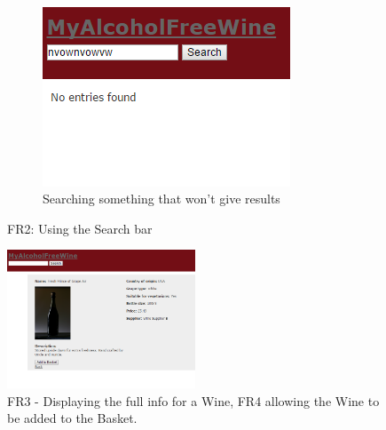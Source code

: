 \documentclass[12pt]{article}
\begin{document}
\begin{figure}[H]
    ~ %
    \begin{subfigure}[b]{0.3\textwidth}
        \includegraphics[width=\textwidth]{assets/FR2_screen_3}
        \caption{Searching something that won't give results}
        \label{fig:FR2 nonsense}
    \end{subfigure}
    \caption{FR2: Using the Search bar}\label{fig:FR2 Search}
\end{figure}

\begin{figure}[H]
        \centering
                \includegraphics[width=0.5\textwidth]{assets/FR3_screen}
                \caption{FR3 - Displaying the full info for a Wine, FR4 allowing the Wine to be added to the Basket.}
                \label{fig: FR3_1.} 
\end{figure}
\end{document}
